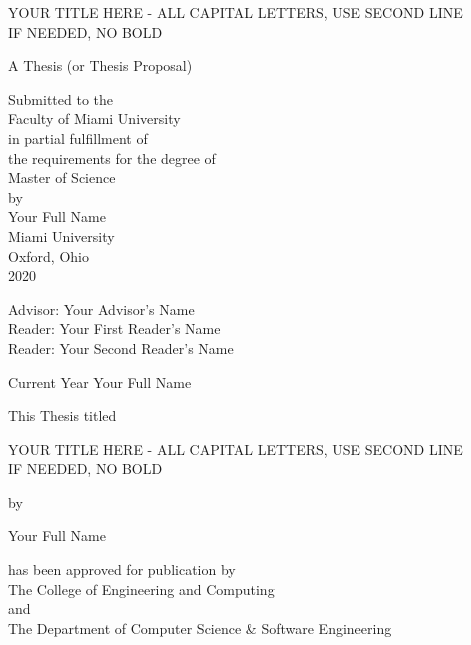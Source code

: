 \documentclass[12pt, oneside]{book2}
\newcommand{\documentTitle}{YOUR TITLE HERE - ALL CAPITAL LETTERS, USE SECOND LINE \\IF NEEDED, NO BOLD}
\newcommand{\documentSubtitle}{A Thesis (or Thesis Proposal)}
\newcommand{\documentAuthor}{Your Full Name}
\newcommand{\documentYear}{2020}
\newcommand{\thesisAdvisor}{Your Advisor's Name}
\newcommand{\thesisFirstReader}{Your First Reader's Name}
\newcommand{\thesisSecondReader}{Your Second Reader's Name}
\begin{document}
\begin{titlepage}
\begin{center}

    \documentTitle

    \vspace{1.5cm}

    \documentSubtitle \\

    \vspace{0.5cm}

    Submitted to the \\
    Faculty of Miami University \\
    in partial fulfillment of \\
    the requirements for the degree of \\
    Master of Science \\
    by \\
    \documentAuthor \\
    Miami University \\
    Oxford, Ohio \\
    \documentYear

    \vspace{1.5cm}

    Advisor: \thesisAdvisor\\
    Reader: \thesisFirstReader\\
    Reader: \thesisSecondReader\\

    \vspace{1.5cm}

    \textcopyright Current Year \documentAuthor

    \newpage

    This Thesis titled

    \vspace{1.0cm}

    \documentTitle

    \vspace{1.0cm}

    by

    \vspace{1.0cm}

    \documentAuthor

    \vspace{1.0cm}

    has been approved for publication by\\
    \vspace{0.75cm}
    The College of Engineering and Computing\\
    \vspace{0.5cm}
    and\\
    \vspace{0.5cm}
    The Department of Computer Science \& Software Engineering\\


\end{center}
\end{titlepage}
\end{document}
